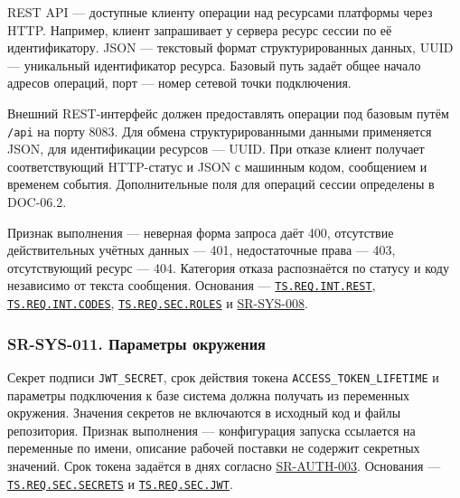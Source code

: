 \documentclass[12pt,a4paper]{article}
\begin{document}
\hypertarget{sr-sys-010-единый-внешний-интерфейс}{}

\hypertarget{sr-sys-010}{}

REST API --- доступные клиенту операции над ресурсами платформы через HTTP. Например, клиент запрашивает у сервера ресурс сессии по её идентификатору. JSON --- текстовый формат структурированных данных, UUID --- уникальный идентификатор ресурса. Базовый путь задаёт общее начало адресов операций, порт --- номер сетевой точки подключения.

Внешний REST-интерфейс должен предоставлять операции под базовым путём \texttt{/api} на порту 8083. Для обмена структурированными данными применяется JSON, для идентификации ресурсов --- UUID. При отказе клиент получает соответствующий HTTP-статус и JSON с машинным кодом, сообщением и временем события. Дополнительные поля для операций сессии определены в DOC-06.2.

Признак выполнения --- неверная форма запроса даёт 400, отсутствие действительных учётных данных --- 401, недостаточные права --- 403, отсутствующий ресурс --- 404. Категория отказа распознаётся по статусу и коду независимо от текста сообщения. Основания --- {\href{../02\_Техническое\_задание/Техническое\_задание.pdf\#ts-req-int-rest}{\texttt{TS.\allowbreak{}REQ.\allowbreak{}INT.\allowbreak{}REST}}}, {\href{../02\_Техническое\_задание/Техническое\_задание.pdf\#ts-req-int-codes}{\texttt{TS.\allowbreak{}REQ.\allowbreak{}INT.\allowbreak{}CODES}}}, {\href{../02\_Техническое\_задание/Техническое\_задание.pdf\#ts-req-sec-roles}{\texttt{TS.\allowbreak{}REQ.\allowbreak{}SEC.\allowbreak{}ROLES}}} и {\hyperlink{sr-sys-008}{SR-SYS-008}}.

\subsubsection{SR-SYS-011. Параметры окружения}\label{sr-sys-011-ux43fux430ux440ux430ux43cux435ux442ux440ux44b-ux43eux43aux440ux443ux436ux435ux43dux438ux44f}

\hypertarget{sr-sys-011-параметры-окружения}{}

\hypertarget{sr-sys-011}{}

Секрет подписи \texttt{JWT\_SECRET}, срок действия токена \texttt{ACCESS\_\allowbreak{}TOKEN\_\allowbreak{}LIFETIME} и параметры подключения к базе система должна получать из переменных окружения. Значения секретов не включаются в исходный код и файлы репозитория. Признак выполнения --- конфигурация запуска ссылается на переменные по имени, описание рабочей поставки не содержит секретных значений. Срок токена задаётся в днях согласно {\hyperlink{sr-auth-003}{SR-AUTH-003}}. Основания --- {\href{../02\_Техническое\_задание/Техническое\_задание.pdf\#ts-req-sec-secrets}{\texttt{TS.\allowbreak{}REQ.\allowbreak{}SEC.\allowbreak{}SECRETS}}} и {\href{../02\_Техническое\_задание/Техническое\_задание.pdf\#ts-req-sec-jwt}{\texttt{TS.\allowbreak{}REQ.\allowbreak{}SEC.\allowbreak{}JWT}}}.
\end{document}
